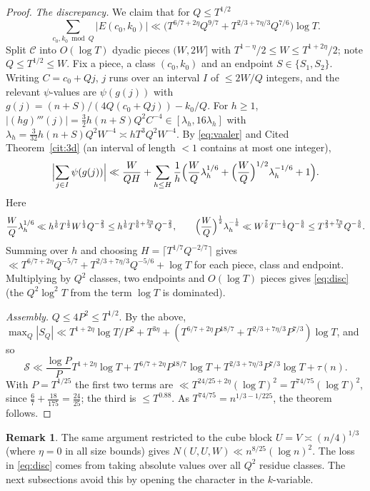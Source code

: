 \documentclass[11pt,reqno]{amsart}
\theoremstyle{definition}
\newtheorem{remark}[theorem]{Remark}
\newcommand{\cC}{\mathcal C}
\newcommand{\cS}{\mathcal S}
\begin{document}
\begin{proof}
\emph{The discrepancy.}  We claim that for $Q\le T^{1/2}$
\begin{equation}\label{eq:disc}
 \sum_{c_0,k_0\bmod Q}|E(c_0,k_0)|\ll
 \bigl(T^{6/7+2\eta}Q^{9/7}+T^{2/3+7\eta/3}Q^{7/6}\bigr)\log T .
\end{equation}
Split $\cC$ into $O(\log T)$ dyadic pieces $(W,2W]$ with
$T^{1-\eta}/2\le W\le T^{1+2\eta}/2$; note $Q\le T^{1/2}\le W$.  Fix a
piece, a class $(c_0,k_0)$ and an endpoint $S\in\{S_1,S_2\}$.  Writing
$C=c_0+Qj$, $j$ runs over an interval $I$ of $\le 2W/Q$ integers, and the
relevant $\psi$-values are $\psi(g(j))$ with
$g(j)=(n+S)/(4Q(c_0+Qj))-k_0/Q$.  For $h\ge1$,
$|(hg)'''(j)|=\frac32h(n+S)Q^2C^{-4}\in[\lambda_h,16\lambda_h]$ with
$\lambda_h=\frac3{32}h(n+S)Q^2W^{-4}\asymp hT^3Q^2W^{-4}$.  By
\eqref{eq:vaaler} and Cited Theorem~\ref{cit:3d} (an interval of length
$<1$ contains at most one integer),
\[
 \Bigl|\sum_{j\in I}\psi(g(j))\Bigr|\ll\frac{W}{QH}+\sum_{h\le
 H}\frac1h\Bigl(\frac WQ\lambda_h^{1/6}+\Bigl(\frac WQ\Bigr)^{1/2}
 \lambda_h^{-1/6}+1\Bigr).
\]
Here
\[
 \frac WQ\lambda_h^{1/6}\ll h^{\frac16}T^{\frac12}W^{\frac13}Q^{-\frac23}\le
 h^{\frac16}T^{\frac56+\frac{2\eta}3}Q^{-\frac23},\qquad
 \Bigl(\frac WQ\Bigr)^{\frac12}\lambda_h^{-\frac16}\ll
 W^{\frac76}T^{-\frac12}Q^{-\frac56}\le T^{\frac23+\frac{7\eta}3}Q^{-\frac56}.
\]
Summing over $h$
and choosing $H=\lceil T^{1/7}Q^{-2/7}\rceil$ gives
$\ll T^{6/7+2\eta}Q^{-5/7}+T^{2/3+7\eta/3}Q^{-5/6}+\log T$ for each piece,
class and endpoint.  Multiplying by $Q^2$ classes, two endpoints and
$O(\log T)$ pieces gives \eqref{eq:disc} (the $Q^2\log^2T$ from the term
$\log T$ is dominated).

\emph{Assembly.}  $Q\le4P^2\le T^{1/2}$.  By the above,
$\max_Q|S_Q|\ll T^{1+2\eta}\log T/P^2+T^{3\eta}
+(T^{6/7+2\eta}P^{18/7}+T^{2/3+7\eta/3}P^{7/3})\log T$, and so
\[
 \cS\ll\frac{\log P}{P}T^{1+2\eta}\log T+T^{6/7+2\eta}P^{18/7}\log T
 +T^{2/3+7\eta/3}P^{7/3}\log T+\tau(n).
\]
With $P=T^{1/25}$ the first two terms are $\ll T^{24/25+2\eta}(\log
T)^2=T^{74/75}(\log T)^2$, since $\frac67+\frac{18}{175}=\frac{24}{25}$;
the third is $\le T^{0.88}$.  As $T^{74/75}=n^{1/3-1/225}$, the theorem
follows.
\end{proof}

\begin{remark}
The same argument restricted to the cube block $U=V\asymp(n/4)^{1/3}$
(where $\eta=0$ in all size bounds) gives $N(U,U,W)\ll
n^{8/25}(\log n)^2$.  The loss in \eqref{eq:disc} comes from taking
absolute values over all $Q^2$ residue classes.  The next subsections
avoid this by opening the character in the $k$-variable.
\end{remark}
\end{document}
